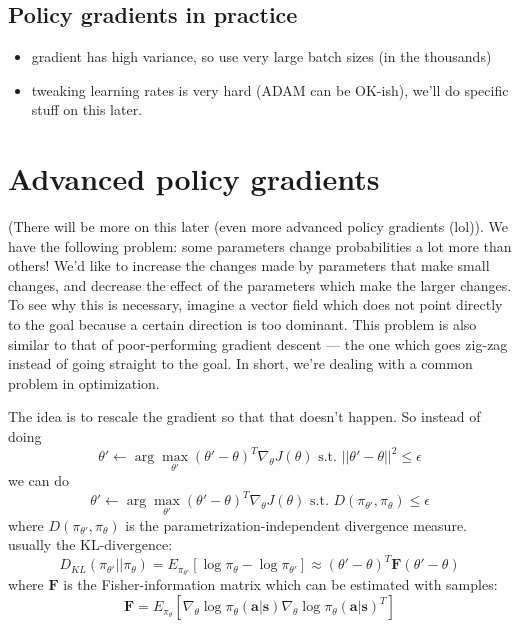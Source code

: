 \documentclass{report}
\newcommand{\argmax}{\arg\!\max}
\begin{document}
\subsection{Policy gradients in practice}
\begin{itemize}
		\item gradient has high variance, so use very large batch sizes (in the thousands)
		\item tweaking learning rates is very hard (ADAM can be OK-ish), we'll do specific stuff on this later.
\end{itemize}

\section{Advanced policy gradients}
(There will be more on this later (even more advanced policy gradients (lol)).
We have the following problem: some parameters change probabilities a lot more than others!
We'd like to increase the changes made by parameters that make small changes, and decrease
the effect of the parameters which make the larger changes.
To see why this is necessary, imagine a vector field which does not point directly to the goal because
a certain direction is too dominant.
This problem is also similar to that of poor-performing gradient descent --- the one which goes zig-zag instead of going
straight to the goal. In short, we're dealing with a common problem in optimization.

The idea is to rescale the gradient so that that doesn't happen.
So instead of doing
\begin{equation}
		\theta' \leftarrow \argmax_{\theta'} (\theta' - \theta)^T \nabla_{\theta}J(\theta) \text{ s.t. } ||\theta' - \theta||^2 \leq \epsilon
\end{equation}
we can do
\begin{equation}
		\theta' \leftarrow \argmax_{\theta'} (\theta' - \theta)^T \nabla_{\theta}J(\theta) \text{ s.t. } D(\pi_{\theta'}, \pi_\theta) \leq \epsilon
\end{equation}
where $D(\pi_{\theta'}, \pi_\theta)$ is the parametrization-independent divergence measure.
usually the KL-divergence:
\begin{equation}
		D_{KL} (\pi_{\theta'}||\pi_\theta) = E_{\pi_{\theta'}} \left[ \log \pi_\theta - \log \pi_{\theta'} \right]  
		\approx (\theta' - \theta)^T \bm{F} (\theta' - \theta)
\end{equation}
where $\bm{F}$ is the Fisher-information matrix which can be estimated with samples:
\begin{equation}
		\bm{F} = E_{\pi_{\theta}} \left[ \nabla_{\theta} \log \pi_\theta(\bm{a}|\bm{s}) \nabla_{\theta} \log \pi_\theta(\bm{a}|\bm{s})^T \right] 
\end{equation}
\end{document}
